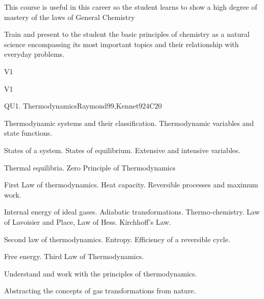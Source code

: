 \begin{syllabus}


\begin{justification}
This course is useful in this career so the student learns to show a high degree of mastery of the laws of General Chemistry
\end{justification}

\begin{goals}
\item Train and present to the student the basic principles of chemistry as a natural science encompassing its most important topics and their relationship with everyday problems.
\end{goals}

\begin{outcomes}{V1}
\end{outcomes}

\begin{competences}{V1}
    \item {}
\end{competences}

\begin{unit}{QU1. Thermodynamics}{}{Raymond99,Kennet92}{4}{C20}
\begin{topics}
     
      \item Thermodynamic systems and their classification. Thermodynamic variables and state functions.
      \item States of a system. States of equilibrium. Extensive and intensive variables.
      \item Thermal equilibria. Zero Principle of Thermodynamics
      \item First Law of thermodynamics. Heat capacity. Reversible processes and maximum work.
      \item Internal energy of ideal gases. Adiabatic transformations. Thermo-chemistry. Law of Lavoisier and Place, Law of Hess. Kirchhoff's Law.
      \item Second law of thermodynamics. Entropy. Efficiency of a reversible cycle.
      \item Free energy. Third Law of Thermodynamics.
\end{topics}

   \begin{learningoutcomes}
      \item Understand and work with the principles of thermodynamics.
      \item Abstracting the concepts of gas transformations from nature.
   \end{learningoutcomes}
\end{unit}


\end{syllabus}
